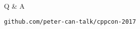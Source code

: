 
%

\begin{slide}{}
  \vspace{1cm}
  {
    \fontsize{48}{48}\selectfont
    \color{orange}
    Q \& A
  }

  \vspace{1.5cm}
  {\large\texttt{github.com/peter-can-talk/cppcon-2017}}
\end{slide}
